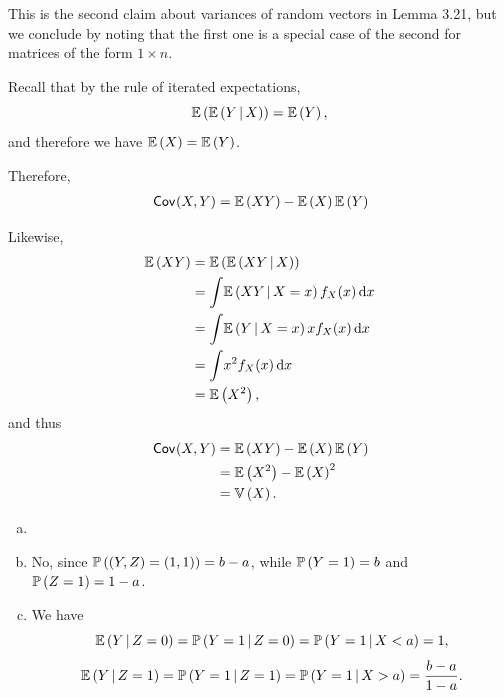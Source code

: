 \begin{ex}
  This is the second claim about variances of random vectors in Lemma 3.21, but
  we conclude by noting that the first one is a special case of the second for
  matrices of the form $1\times n$.
\end{ex}

\begin{ex}
  Recall that by the rule of iterated expectations,
  \[
    \E{\cE{Y}{X}}=\E{Y},
  \]
  and therefore we have $\E{X}=\E{Y}$.

  Therefore,
  \begin{align*}
    \cov{X, Y}
     & =\E{XY} - \E{X}\E{Y} \\
  \end{align*}

  Likewise,
  \begin{align*}
    \E{XY}
     & =\E{\cE{XY}{X}}                     \\
     & =\int\! \cE{XY}{X=x} f_X(x) \,\d{x} \\
     & =\int\! \cE{Y}{X=x} xf_X(x) \,\d{x} \\
     & =\int\! x^2f_X(x) \,\d{x}           \\
     & =\E{X^2},
  \end{align*}
  and thus
  \begin{align*}
    \cov{X, Y}
     & =\E{XY} - \E{X}\E{Y} \\
     & =\E{X^2} - \E{X}^2   \\
     & = \var{X}.
  \end{align*}
\end{ex}

\begin{ex}
  \begin{enumerate}[(a)]
    \item[]
    \item No, since $\P{(Y, Z)=(1, 1)}=b-a$, while
          $\P{Y=1}=b$ and $\P{Z=1}=1-a$.
    \item We have
          \[
            \cE{Y}{Z=0}
            =\cP{Y=1}{Z=0}
            =\cP{Y=1}{X<a}
            =1,
          \]
          \[
            \cE{Y}{Z=1}
            =\cP{Y=1}{Z=1}
            =\cP{Y=1}{X>a}
            =\frac{b-a}{1-a}.
          \]
  \end{enumerate}
\end{ex}

